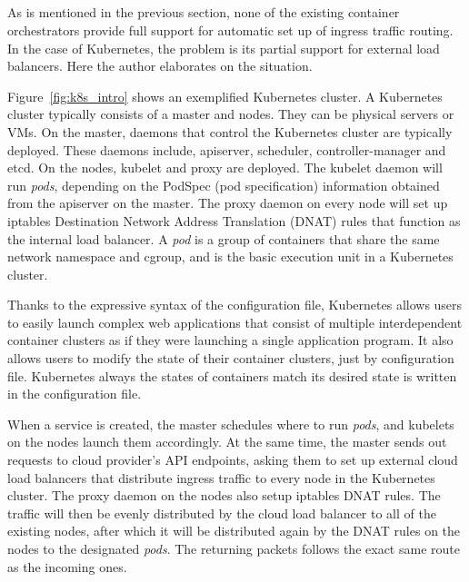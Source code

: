 \subsection{}

As is mentioned in the previous section, none of the existing container orchestrators provide full support for automatic set up of ingress traffic routing.
In the case of Kubernetes, the problem is its partial support for external load balancers.
Here the author elaborates on the situation.

Figure~\ref{fig:k8s_intro} shows an exemplified Kubernetes cluster.
A Kubernetes cluster typically consists of a master and nodes. They can be physical servers or VMs.
On the master, daemons that control the Kubernetes cluster are typically deployed. 
These daemons include, apiserver, scheduler, controller-manager and etcd. 
On the nodes, kubelet and proxy are deployed.
The kubelet daemon will run {\it pods}, depending on the PodSpec (pod specification) information obtained from the apiserver on the master.
The proxy daemon on every node will set up iptables Destination Network Address Translation (DNAT) rules that function as the internal load balancer.
A {\em pod} is a group of containers that share the same network namespace and cgroup,
and is the basic execution unit in a Kubernetes cluster.

Thanks to the expressive syntax of the configuration file, Kubernetes allows users to easily launch complex web applications that consist of multiple interdependent container clusters as if they were launching a single application program.
It also allows users to modify the state of their container clusters, just by  configuration file.
Kubernetes always  the states of containers  match its desired state is written in the configuration file.

When a service is created, the master schedules where to run {\em pods}, and  kubelets on the nodes launch them accordingly.
At the same time, the master sends out requests to cloud provider's API endpoints, asking them to set up external cloud load balancers that distribute ingress traffic to every node in the Kubernetes cluster.
The proxy daemon on the nodes also setup iptables DNAT \cite{MartinA.Brown2017} rules. 
The  traffic will then be evenly distributed by the cloud load balancer to all of the existing nodes, 
after which it will be distributed again by the DNAT rules on the nodes to the designated {\em pods}. 
The returning packets follows the exact same route as the incoming ones.

